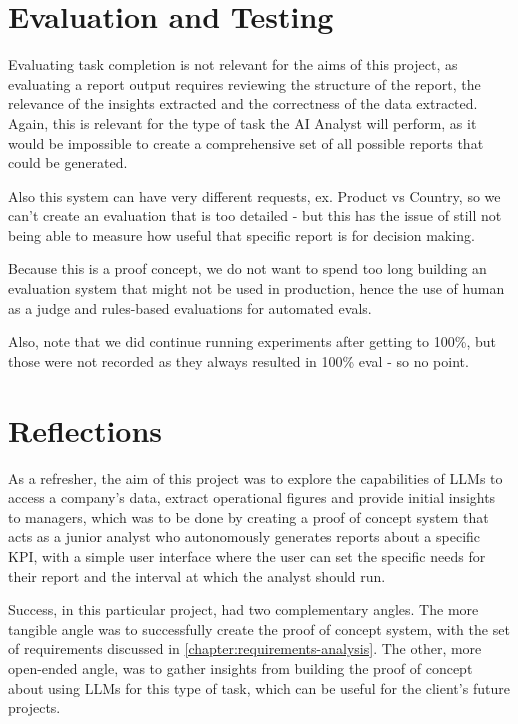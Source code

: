 \documentclass[a4paper]{report}
\begin{document}
\chapter{Evaluation and Testing}
\label{chapter:evaluation-testing}

Evaluating task completion is not relevant for the aims of this project, as evaluating a report output requires reviewing the structure of the report, the relevance of the insights extracted and the correctness of the data extracted. Again, this is relevant for the type of task the AI Analyst will perform, as it would be impossible to create a comprehensive set of all possible reports that could be generated.

Also this system can have very different requests, ex. Product vs Country, so we can't create an evaluation that is too detailed - but this has the issue of still not being able to measure how useful that specific report is for decision making.

Because this is a proof concept, we do not want to spend too long building an evaluation system that might not be used in production, hence the use of human as a judge and rules-based evaluations for automated evals.

Also, note that we did continue running experiments after getting to 100\%, but those were not recorded as they always resulted in 100\% eval - so no point.

\chapter{Reflections}
\label{chapter:reflections}

As a refresher, the aim of this project was to explore the capabilities of LLMs to access a company's data, extract operational figures and provide initial insights to managers, which was to be done by creating a proof of concept system that acts as a junior analyst who autonomously generates reports about a specific KPI, with a simple user interface where the user can set the specific needs for their report and the interval at which the analyst should run.

Success, in this particular project, had two complementary angles. The more tangible angle was to successfully create the proof of concept system, with the set of requirements discussed in \autoref{chapter:requirements-analysis}. The other, more open-ended angle, was to gather insights from building the proof of concept about using LLMs for this type of task, which can be useful for the client's future projects.
\end{document}

